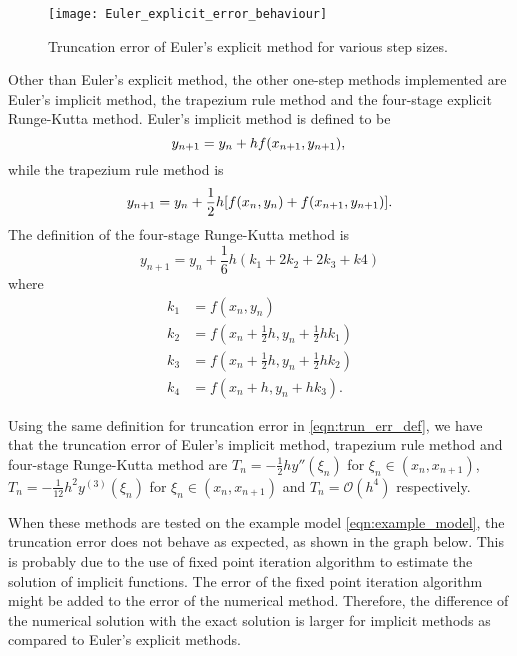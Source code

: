 \begin{figure}
    \texttt{[image: Euler\_explicit\_error\_behaviour]}
    \caption{Truncation error of Euler's explicit method for various step sizes.}
    \label{fig:Euler_explicit_error_behaviour}
\end{figure}

Other than Euler's explicit method, the other one-step methods implemented are Euler's implicit method, the trapezium rule method and the four-stage explicit Runge-Kutta method. Euler's implicit method is defined to be
\begin{equation}
    y_{n+1} = y_n + hf(x_{n+1},y_{n+1}),\\
\end{equation}
while the trapezium rule method is
\begin{equation}
    y_{n+1} = y_n + \frac{1}{2}h[f(x_n,y_n) + f(x_{n+1},y_{n+1})].\\
\end{equation}
The definition of the four-stage Runge-Kutta method is
\begin{equation}
    y_{n+1} = y_n + \frac{1}{6}h(k_1 + 2k_2 + 2k_3 + k4)
\end{equation}
where
\begin{align}
    k_1 &= f(x_n, y_n) \\
    k_2 &= f(x_n + \frac{1}{2}h, y_n + \frac{1}{2}hk_1) \\
    k_3 &= f(x_n + \frac{1}{2}h, y_n + \frac{1}{2}hk_2) \\
    k_4 &= f(x_n + h, y_n + hk_3).
\end{align}

Using the same definition for truncation error in \ref{eqn:trun_err_def}, we have that the truncation error of Euler's implicit method, trapezium rule method and four-stage Runge-Kutta method are $T_n = -\frac{1}{2}hy''(\xi_n)$ for $\xi_n \in (x_n, x_{n+1})$, $T_n = -\frac{1}{12}h^2y^{(3)}(\xi_n)$ for $\xi_n \in (x_n, x_{n+1})$ and $T_n = \mathcal{O}(h^4)$ respectively.

When these methods are tested on the example model \ref{eqn:example_model}, the truncation error does not behave as expected, as shown in the graph below. This is probably due to the use of fixed point iteration algorithm to estimate the solution of implicit functions. The error of the fixed point iteration algorithm might be added to the error of the numerical method. Therefore, the difference of the numerical solution with the exact solution is larger for implicit methods as compared to Euler's explicit methods.

